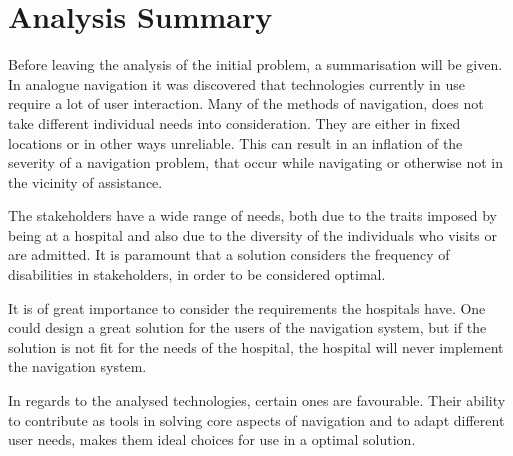 \section{Analysis Summary} \label{analsum}
Before leaving the analysis of the initial problem, a summarisation will be given. In analogue navigation it was discovered that technologies currently in use require a lot of user interaction. Many of the methods of navigation, does not take different individual needs into consideration. They are either in fixed locations or in other ways unreliable. This can result in an inflation of the severity of a navigation problem, that occur while navigating or otherwise not in the vicinity of assistance. 

The stakeholders have a wide range of needs, both due to the traits imposed by being at a hospital and also due to the diversity of the individuals who visits or are admitted. It is paramount that a solution considers the frequency of disabilities in stakeholders, in order to be considered optimal.

It is of great importance to consider the requirements the hospitals have. One could design a great solution for the users of the navigation system, but if the solution is not fit for the needs of the hospital, the hospital will never implement the navigation system.

In regards to the analysed technologies, certain ones are favourable. Their ability to contribute as tools in solving core aspects of navigation and to adapt different user needs, makes them ideal choices for use in a optimal solution.